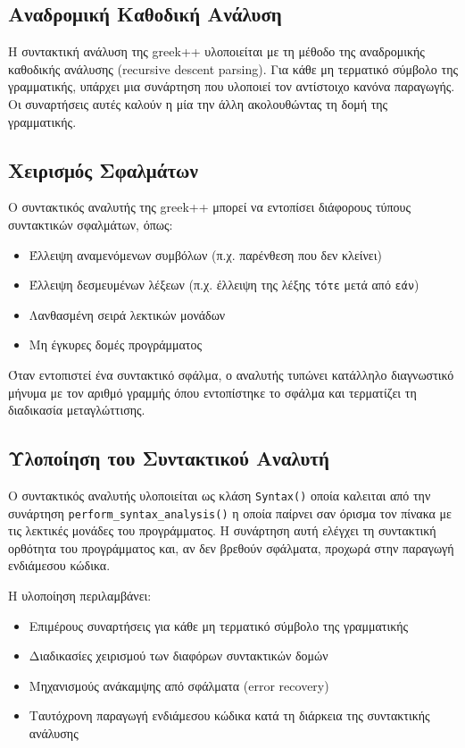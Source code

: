 \documentclass[12pt,a4paper]{article}
\begin{document}
        \subsection{Αναδρομική Καθοδική Ανάλυση}
            Η συντακτική ανάλυση της greek++ υλοποιείται με τη μέθοδο της αναδρομικής καθοδικής ανάλυσης (recursive descent parsing). Για κάθε μη τερματικό σύμβολο της γραμματικής, υπάρχει μια συνάρτηση που υλοποιεί τον αντίστοιχο κανόνα παραγωγής. Οι συναρτήσεις αυτές καλούν η μία την άλλη ακολουθώντας τη δομή της γραμματικής.

        \subsection{Χειρισμός Σφαλμάτων}
            Ο συντακτικός αναλυτής της greek++ μπορεί να εντοπίσει διάφορους τύπους συντακτικών σφαλμάτων, όπως:
            \begin{itemize}
                \item Έλλειψη αναμενόμενων συμβόλων (π.χ. παρένθεση που δεν κλείνει)
                \item Έλλειψη δεσμευμένων λέξεων (π.χ. έλλειψη της λέξης \texttt{τότε} μετά από \texttt{εάν})
                \item Λανθασμένη σειρά λεκτικών μονάδων
                \item Μη έγκυρες δομές προγράμματος
            \end{itemize}

            Όταν εντοπιστεί ένα συντακτικό σφάλμα, ο αναλυτής τυπώνει κατάλληλο διαγνωστικό μήνυμα με τον αριθμό γραμμής όπου εντοπίστηκε το σφάλμα και τερματίζει τη διαδικασία μεταγλώττισης.

        \subsection{Υλοποίηση του Συντακτικού Αναλυτή}
            Ο συντακτικός αναλυτής υλοποιείται ως κλάση \texttt{Syntax()}  οποία καλειται από την συνάρτηση \texttt{perform\_syntax\_analysis()} η οποία παίρνει σαν όρισμα τον πίνακα με τις λεκτικές μονάδες του προγράμματος. Η συνάρτηση αυτή ελέγχει τη συντακτική ορθότητα του προγράμματος και, αν δεν βρεθούν σφάλματα, προχωρά στην παραγωγή ενδιάμεσου κώδικα.

            Η υλοποίηση περιλαμβάνει:
            \begin{itemize}
                \item Επιμέρους συναρτήσεις για κάθε μη τερματικό σύμβολο της γραμματικής
                \item Διαδικασίες χειρισμού των διαφόρων συντακτικών δομών
                \item Μηχανισμούς ανάκαμψης από σφάλματα (error recovery)
                \item Ταυτόχρονη παραγωγή ενδιάμεσου κώδικα κατά τη διάρκεια της συντακτικής ανάλυσης
            \end{itemize}
\end{document}

